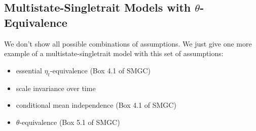 \documentclass[10pt]{article}\usepackage{graphicx, color}
\begin{document}
%



\subsection{Multistate-Singletrait Models with $\theta$-Equivalence}

We don't show all possible combinations of assumptions. We just give one more example of a multistate-singletrait model with this set of assumptions:
%
\begin{itemize}
  \item essential $\eta_t$-equivalence (Box 4.1 of SMGC)
  \item scale invariance over time
  \item conditional mean independence (Box 4.1 of SMGC)
  \item $\theta$-equivalence (Box 5.1 of SMGC)
\end{itemize}
%
%
\end{document}
